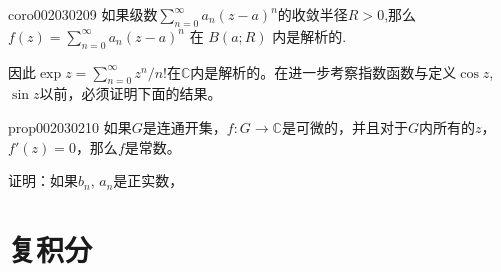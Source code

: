 \begin{corollary}{}{coro002030209}
如果级数$\sum\limits_{n=0}^{\infty}{a_n(z-a)^n}$的收敛半径$R>0$,那么$f(z)=\sum\limits_{n=0}^{\infty}{a_n(z-a)^n}$ 在 $B(a; R)$ 内是解析的.
\end{corollary}

因此$\exp{z} = \sum\limits_{n=0}^{\infty}{z^n/n!}$在$\mathbb{C}$内是解析的。在进一步考察指数函数与定义$\cos{z}$, $\sin{z}$以前，必须证明下面的结果。

\begin{proposition}{}{prop002030210}
如果$G$是连通开集，$f: G \to \mathbb{C}$是可微的，并且对于$G$内所有的$z$，$f'(z)=0$，那么$f$是常数。
\end{proposition}

\begin{exercise}\label{exer002030202}
证明：如果$b_n$, $a_n$是正实数，
\end{exercise}


\chapter{复积分}\label{chapter00204}

















